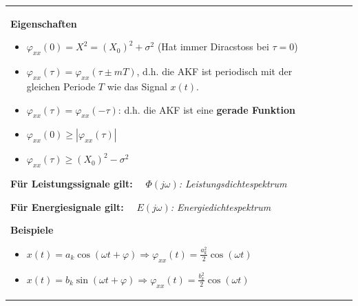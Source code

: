 		\begin{tabularx}{\textwidth}{lXX}
		\parbox{10cm}{
			\textbf{Eigenschaften}
			\begin{itemize}
     			\item $\varphi_{xx}(0) = X^2 = (X_0)^2+\sigma^2$ (Hat immer Diracstoss bei $\tau = 0$)
     			\item $\varphi_{xx}(\tau)=\varphi_{xx}(\tau\pm mT)$, d.h. die AKF
     				ist periodisch mit der gleichen Periode $T$ wie das Signal $x(t)$.
				\item $\varphi_{xx}(\tau)=\varphi_{xx}(-\tau)$: d.h. die AKF ist eine {\bf gerade Funktion}
				\item $\varphi_{xx}(0)\geq|\varphi_{xx}(\tau)|\quad$
				\item $\varphi_{xx}(\tau)\geq (X_0)^2-\sigma^2\quad$
   			\end{itemize}
   			
   			\textbf{Für Leistungssignale gilt:} \ \ \textit{$\Phi(j\omega)$: Leistungsdichtespektrum} \\
   			\\
						
			\textbf{Für Energiesignale gilt:} \ \ \textit{$E(j\omega)$: Energiedichtespektrum} \\
   			\\
   
   			\textbf{Beispiele}
   			\begin{itemize}
     			\item $x(t) = a_k \cos(\omega t + \varphi) \Rightarrow \varphi_{xx}(t) = \frac{a_k^2}{2} \cos(\omega t)$
     			\item $x(t) = b_k \sin(\omega t + \varphi) \Rightarrow \varphi_{xx}(t) = \frac{b_k^2}{2} \cos(\omega t)$
   			\end{itemize}
   		} 
   		&
   		\parbox{5cm}{

}
\end{tabularx}
